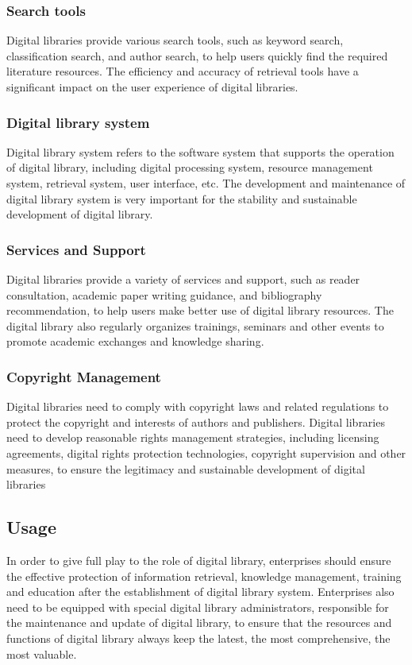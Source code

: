 \subsubsection{Search tools}
Digital libraries provide various search tools, such as keyword search, classification search, and author search, to help users quickly find the required literature resources. The efficiency and accuracy of retrieval tools have a significant impact on the user experience of digital libraries.

\subsubsection{Digital library system}
Digital library system refers to the software system that supports the operation of digital library, including digital processing system, resource management system, retrieval system, user interface, etc. The development and maintenance of digital library system is very important for the stability and sustainable development of digital library.

\subsubsection{Services and Support}
Digital libraries provide a variety of services and support, such as reader consultation, academic paper writing guidance, and bibliography recommendation, to help users make better use of digital library resources. The digital library also regularly organizes trainings, seminars and other events to promote academic exchanges and knowledge sharing.

\subsubsection{Copyright Management}
Digital libraries need to comply with copyright laws and related regulations to protect the copyright and interests of authors and publishers. Digital libraries need to develop reasonable rights management strategies, including licensing agreements, digital rights protection technologies, copyright supervision and other measures, to ensure the legitimacy and sustainable development of digital libraries
 
\subsection{Usage}
In order to give full play to the role of digital library, enterprises should ensure the effective protection of information retrieval, knowledge management, training and education after the establishment of digital library system. Enterprises also need to be equipped with special digital library administrators, responsible for the maintenance and update of digital library, to ensure that the resources and functions of digital library always keep the latest, the most comprehensive, the most valuable.

